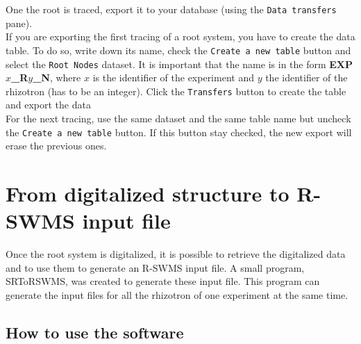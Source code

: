 \documentclass[a4paper,english,10pt]{report}
\begin{document}
One the root is traced, export it to your database (using the \verb|Data transfers| pane). \\

If you are exporting the first tracing of a root system, you have to create the data table. To do so, write down its name, check the \verb|Create a new table| button and select the \verb|Root Nodes| dataset. It is important that the name is in the form \textbf{{\color{red}EXP}$x${\color{red}\_R}$y${\color{red}\_N}}, where $x$ is the identifier of the experiment and $y$ the identifier of the rhizotron (has to be an integer). Click the \verb|Transfers| button to create the table and export the data\\

For the next tracing, use the same dataset and the same table name but uncheck the \verb|Create a new table| button. If this button stay checked, the new export will erase the previous ones.



\chapter{From digitalized structure to R-SWMS input file}

Once the root system is digitalized, it is possible to retrieve the digitalized data and to use them to generate an R-SWMS input file. A small program, SRToRSWMS, was created to generate these input file. This program can generate the input files for all the rhizotron of one experiment at the same time.

\section{How to use the software}
\end{document}
